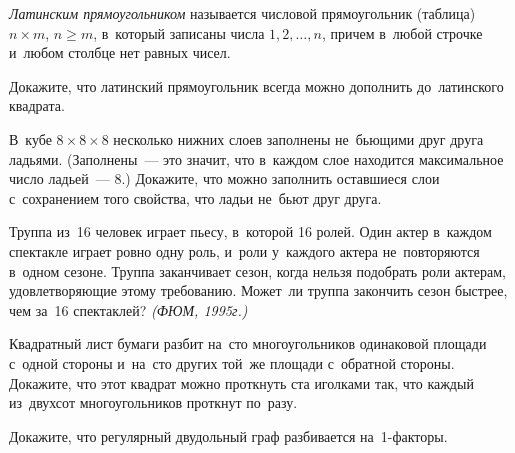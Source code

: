 \emph{Латинским прямоугольником} называется числовой прямоугольник (таблица)
$n \times m$, $n \geq m$, в~который записаны числа $1, 2, \ldots, n$, причем
в~любой строчке и~любом столбце нет равных чисел.

\begin{problems}

\item
Докажите, что латинский прямоугольник всегда можно дополнить до~латинского
квадрата.

\item
В~кубе $8 \times 8 \times 8$ несколько нижних слоев заполнены не~бьющими друг
друга ладьями.
(Заполнены~--- это значит, что в~каждом слое находится максимальное число
ладьей~--- 8.)
Докажите, что можно заполнить оставшиеся слои с~сохранением того свойства, что
ладьи не~бьют друг друга.

\item
Труппа из~16 человек играет пьесу, в~которой 16 ролей.
Один актер в~каждом спектакле играет ровно одну роль, и~роли у~каждого актера
не~повторяются в~одном сезоне.
Труппа заканчивает сезон, когда нельзя подобрать роли актерам, удовлетворяющие
этому требованию.
Может~ли труппа закончить сезон быстрее, чем за~16 спектаклей?
\emph{(ФЮМ, 1995г.)}

\item
Квадратный лист бумаги разбит на~сто многоугольников одинаковой площади с~одной
стороны и~на~сто других той~же площади с~обратной стороны.
Докажите, что этот квадрат можно проткнуть ста иголками так, что каждый
из~двухсот многоугольников проткнут по~разу.

\item
Докажите, что регулярный двудольный граф разбивается на~1-факторы.

\end{problems}

